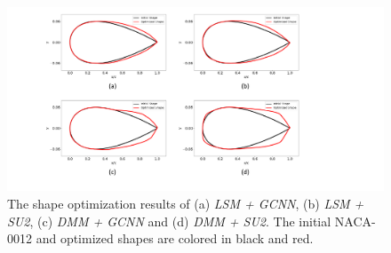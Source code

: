 \begin{figure}[!htb]
    \begin{center}
        \includegraphics[width=1\linewidth]{chapter4/fig/final_optim_result.pdf}
    \end{center}
    \caption{
        \small The shape optimization results of (a) \textit{LSM + GCNN}, (b) \textit{LSM + SU2}, (c) \textit{DMM + GCNN} and (d) \textit{DMM + SU2}. The initial NACA-0012 and optimized shapes are colored in black and red.
    }
    \label{ch4:fig:final_optim_results}
\end{figure}